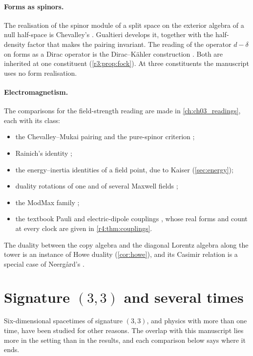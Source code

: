 \paragraph{Forms as spinors.} The realisation of the spinor module of a split space on the exterior algebra of a null half-space is
Chevalley's \cite{Chevalley54}. Gualtieri \cite{Gualtieri03,Gualtieri11} develops it, together with the half-density factor that makes the
pairing invariant. The reading of the operator $d-\delta$ on forms as a Dirac operator is the Dirac--K\"ahler construction
\cite{Kahler62,Graf78,BecherJoos82,BennTucker83}. Both are inherited at one constituent (\cref{r3:prop:fock}). At three constituents the
manuscript uses no form realisation.

\paragraph{Electromagnetism.} The comparisons for the field-strength reading are made in \cref{ch:ch03_readings}, each with its class:
\begin{itemize}
\item the Chevalley--Mukai pairing and the pure-spinor criterion \cite{Chevalley54,Gualtieri03};
\item Rainich's identity \cite{Rainich1925};
\item the energy--inertia identities of a field point, due to Kaiser \cite{Kaiser11} (\cref{sec:energy});
\item duality rotations of one and of several Maxwell fields \cite{GaillardZumino81};
\item the ModMax family \cite{BandosLechnerSorokinTownsend20,Kosyakov20};
\item the textbook Pauli and electric-dipole couplings \cite{Pauli41}, whose real forms and count at every clock are given in
\cref{r4:thm:couplings}.
\end{itemize}
The duality between the copy algebra and the diagonal Lorentz algebra along the tower is an instance of Howe duality \cite{Howe89}
(\cref{cor:howe}), and its Casimir relation is a special case of Neerg{\aa}rd's \cite{Neergard19,Neergard20}.

\section{Signature \texorpdfstring{$(3,3)$}{(3,3)} and several times}
\label{sec:rel:times}

Six-dimensional spacetimes of signature $(3,3)$, and physics with more than one time, have been studied for other reasons. The overlap with
this manuscript lies more in the setting than in the results, and each comparison below says where it ends.

